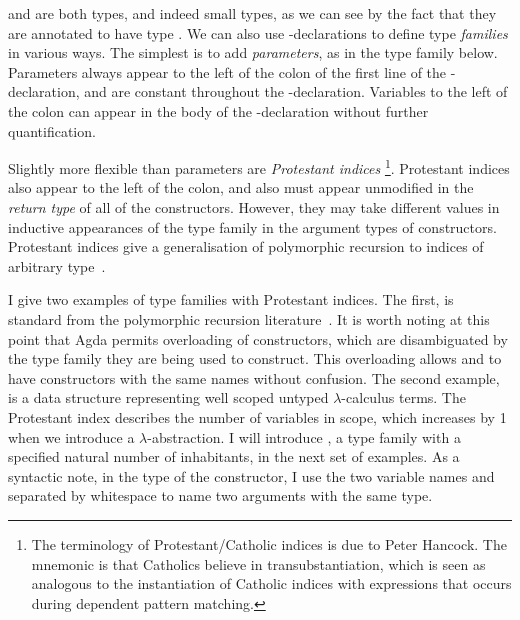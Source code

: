  and  are both types, and indeed
small types, as we can see by the fact that they are annotated to have type
.
We can also use -declarations to define type \emph{families}
in various ways.
The simplest is to add \emph{parameters}, as in the type family
 below.
Parameters always appear to the left of the colon of the first line of the
-declaration, and are constant throughout the
-declaration.
Variables to the left of the colon can appear in the body of the
-declaration without further quantification.


Slightly more flexible than parameters are \emph{Protestant indices}%
\footnote{The terminology of Protestant/Catholic indices is due to Peter
  Hancock. The mnemonic is that Catholics believe in transubstantiation, which
  is seen as analogous to the instantiation of Catholic indices with expressions
  that occurs during dependent pattern matching.}.
Protestant indices also appear to the left of the colon, and also must appear
unmodified in the \emph{return type} of all of the constructors.
However, they may take different values in inductive appearances of the type
family in the argument types of constructors.
Protestant indices give a generalisation of polymorphic
recursion to indices of arbitrary type~\citep{Mycroft84,Henglein93}.

I give two examples of type families with Protestant indices.
The first,  is standard from the polymorphic recursion
literature~\citep{BM98}.
It is worth noting at this point that Agda permits overloading of constructors,
which are disambiguated by the type family they are being used to construct.
This overloading allows  and  to
have constructors with the same names without confusion.
The second example,  is a data structure representing
well scoped untyped $\lambda$-calculus terms.
The Protestant index  describes the number of variables in scope,
which increases by 1 when we introduce a $\lambda$-abstraction.
I will introduce , a type family with a specified natural
number of inhabitants, in the next set of examples.
As a syntactic note, in the type of the 
constructor, I use the two variable names  and 
separated by whitespace to name two arguments with the same type.

